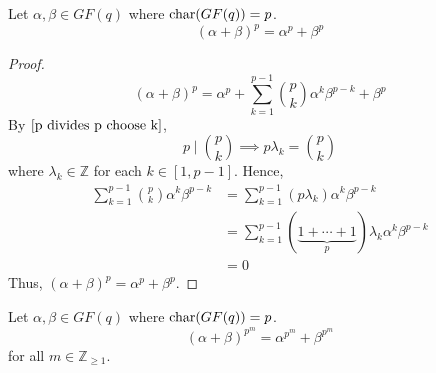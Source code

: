 \begin{thmbox}
    \begin{theorem}
        Let $ \alpha,\beta\in GF(q) $ where $ \operatorname{char}(GF(q))=p $.
        \[ (\alpha + \beta)^p=\alpha^p+\beta^p \]
    \end{theorem}
\end{thmbox}

\begin{proof}
    \[ (\alpha + \beta)^p=\alpha^p+\sum\limits_{k=1}^{p-1}
        \binom{p}{k}\alpha^k\beta^{p-k}+\beta^p \]
    By $ \ref{p divides p choose k} $,
    \[ p\mid \binom{p}{k}\implies p\lambda_k=\binom{p}{k} \]
    where $ \lambda_k\in\mathbb{Z} $ for each $ k\in[1,p-1] $. Hence,
    \begin{align*}
        \sum\limits_{k=1}^{p-1}\binom{p}{k}\alpha^k\beta^{p-k}
         & = \sum\limits_{k=1}^{p-1} (p\lambda_k) \alpha^k\beta^{p-k}                          \\
         & =\sum\limits_{k=1}^{p-1} (\underbrace{1+\cdots+1}_{p})\lambda_k \alpha^k\beta^{p-k} \\
         & =0
    \end{align*}
    Thus, $ (\alpha + \beta)^p=\alpha^p+\beta^p $.
\end{proof}

\begin{thmbox}
    \begin{corollary}
        Let $ \alpha,\beta\in GF(q) $ where $ \operatorname{char}(GF(q))=p $.
        \[ (\alpha+\beta)^{p^m}=\alpha^{p^m}+\beta^{p^m} \]
        for all $ m\in\mathbb{Z}_{\geqslant 1} $.
    \end{corollary}
\end{thmbox}


